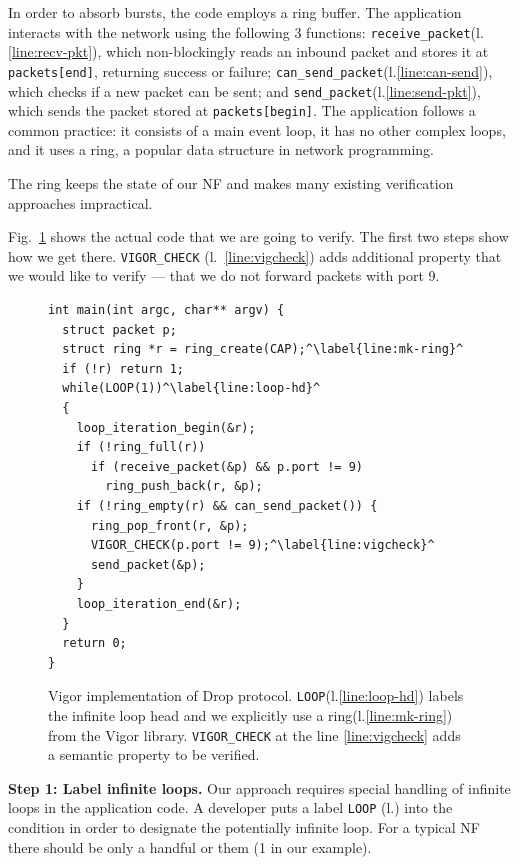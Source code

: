 \documentclass[letterpaper,twocolumn,10pt]{article}
\newcommand{\code}[1]{\lstinline{#1}}
\begin{document}
In order to absorb bursts, the code employs a ring buffer. The application
interacts with the network using the following 3 functions:
\code{receive_packet}(l.\ref{line:recv-pkt}), which non-blockingly reads an
inbound packet and stores it at \code{packets[end]}, returning success or
failure; \code{can_send_packet}(l.\ref{line:can-send}), which checks if a new
packet can be sent; and \code{send_packet}(l.\ref{line:send-pkt}), which sends
the packet stored at \code{packets[begin]}. The application follows a common
practice: it consists of a main event loop, it has no other complex loops, and
it uses a ring, a popular data structure in network programming.

The ring keeps the state of our NF and makes many existing verification
approaches impractical.

Fig.~\ref{lst:vigor} shows the actual code that we are going to verify. The
first two steps show how we get there. \code{VIGOR_CHECK}
(l.~\ref{line:vigcheck}) adds additional property that we would like to verify
--- that we do not forward packets with port 9.

\begin{figure}[h!]
\begin{lstlisting}
int main(int argc, char** argv) {
  struct packet p;
  struct ring *r = ring_create(CAP);^\label{line:mk-ring}^
  if (!r) return 1;
  while(LOOP(1))^\label{line:loop-hd}^
  {
    loop_iteration_begin(&r);
    if (!ring_full(r))
      if (receive_packet(&p) && p.port != 9)
        ring_push_back(r, &p);
    if (!ring_empty(r) && can_send_packet()) {
      ring_pop_front(r, &p);
      VIGOR_CHECK(p.port != 9);^\label{line:vigcheck}^
      send_packet(&p);
    }
    loop_iteration_end(&r);
  }
  return 0;
}
\end{lstlisting}
  \caption{Vigor implementation of Drop protocol.
    \code{LOOP}(l.\ref{line:loop-hd}) labels the infinite loop head and we
    explicitly use a ring(l.\ref{line:mk-ring}) from the Vigor library. \code{VIGOR_CHECK} at the
    line \ref{line:vigcheck} adds a semantic property to be verified.}
  \label{lst:vigor}
\end{figure}

{\bf Step 1: Label infinite loops.} Our approach requires special handling of
infinite loops in the application code. A developer puts a label \code{LOOP}
(l.\label{line:loophd}) into the condition in order to designate the
potentially infinite loop. For a typical NF there should be only a handful or
them (1 in our example).
\end{document}
